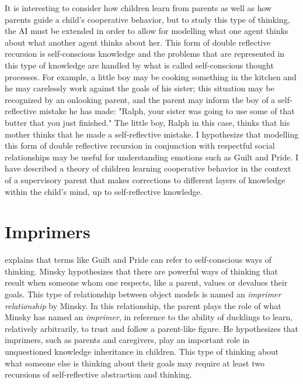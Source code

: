 It is interesting to consider how children learn from parents as well
as how parents guide a child's cooperative behavior, but to study this
type of thinking, the AI must be extended in order to allow for
modelling what one agent thinks about what another agent thinks about
her.  This form of double reflective recursion is self-conscious
knowledge and the problems that are represented in this type of
knowledge are handled by what is called self-conscious thought
processes. For example, a little boy may be cooking something in the
kitchen and he may carelessly work against the goals of his sister;
this situation may be recognized by an onlooking parent, and the
parent may inform the boy of a self-reflective mistake he has made:
"Ralph, your sister was going to use some of that butter that you just
finished." The little boy, Ralph in this case, thinks that his mother
thinks that he made a self-reflective mistake. I hypothesize that
modelling this form of double reflective recursion in conjunction with
respectful social relationships may be useful for understanding
emotions such as Guilt and Pride.  I have described
\cite[]{morgan:2010} a theory of children learning cooperative
behavior in the context of a supervisory parent that makes corrections
to different layers of knowledge within the child's mind, up to
self-reflective knowledge.

\section{Imprimers}

\cite{minsky:2006} explains that terms like Guilt and Pride can refer
to self-conscious ways of thinking.  Minsky hypothesizes that there
are powerful ways of thinking that result when someone whom one
respects, like a parent, values or devalues their goals.  This type of
relationship between object models is named an \emph{imprimer
  relationship} by Minsky.  In this relationship, the parent plays the
role of what Minsky has named an \emph{imprimer}, in reference to the
ability of ducklings to learn, relatively arbitrarily, to trust and
follow a parent-like figure.  He hypothesizes that imprimers, such as
parents and caregivers, play an important role in unquestioned
knowledge inheritance in children.  This type of thinking about what
someone else is thinking about their goals may require at least two
recursions of self-reflective abstraction and thinking.


